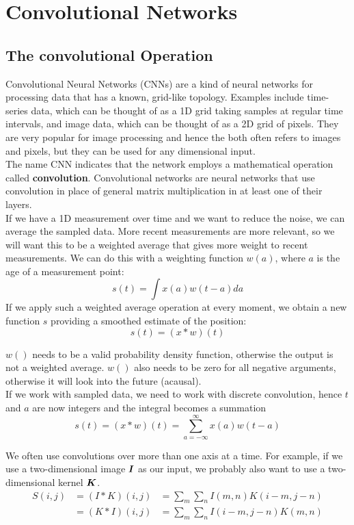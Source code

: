 \section{Convolutional Networks}
\begin{multicols}{2}
	\subsection{The convolutional Operation}
	Convolutional Neural Networks (CNNs) are a kind of neural networks for processing data that has a known, grid-like topology.
	Examples include time-series data, which can be thought of as a 1D grid taking samples at regular time intervals, and image data, which can be thought of as a 2D grid of pixels.
	They are very popular for image processing and hence the both often refers to images and pixels, but they can be used for any dimensional input.\\
	
	The name CNN indicates that the network employs a mathematical operation called \textbf{convolution}.
	Convolutional networks are neural networks that use convolution in place of general matrix multiplication in at least one of their layers.\\
	
	If we have a 1D measurement over time and we want to reduce the noise, we can average the sampled data.
	More recent measurements are more relevant, so we will want this to be a weighted average that gives more weight to recent measurements.
	We can do this with a weighting function $w(a)$, where $a$ is the age of a measurement point:
	\[ s(t) = \int x(a)w(t-a)da \]
	If we apply such a weighted average operation at every moment, we obtain a new function $s$ providing a smoothed estimate of the position:
	\[ s(t) = (x\ast w)(t) \]
	
	$w()$ needs to be a valid probability density function, otherwise the output is not a weighted average.
	$w()$ also needs to be zero for all negative arguments, otherwise it will look into the future (acausal).\\
	If we work with sampled data, we need to work with discrete convolution, hence $t$ and $a$ are now integers and the integral becomes a summation
	\[ s(t) = (x\ast w)(t) = \sum_{a=-\infty}^{\infty} x(a)w(t-a) \]
	
	We often use convolutions over more than one axis at a time.
	For example, if we use a two-dimensional image ${\bm{I}}$ as our input, we probably also want to use a two-dimensional kernel ${\bm{K}}$.
	\begin{align*}
		S(i,j)
		&= (I\ast K)(i,j) &= \sum_m\sum_n I(m,n) K(i-m,j-n)\\
		&= (K\ast I)(i,j) &= \sum_m\sum_n I(i-m,j-n) K(m,n)
	\end{align*}
	

\end{multicols}
